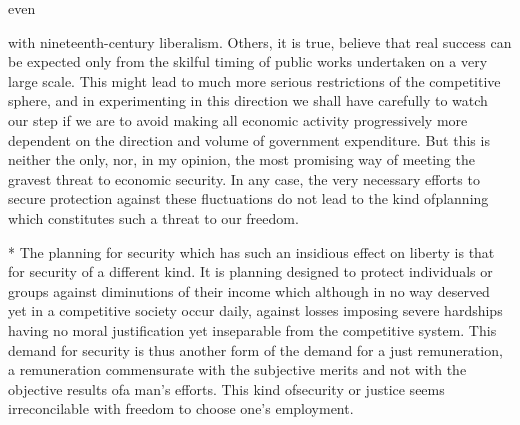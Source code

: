 \documentclass[11pt,openany]{book}
\begin{document}
even

with nineteenth-century liberalism. Others, it is true, believe that real success can be expected only from the skilful timing of public works undertaken on a very large scale. This might lead to much more serious restrictions of the competitive sphere, and in experimenting in this direction we shall have carefully to watch our step if we are to avoid making all economic activity progressively more dependent on the direction and volume of government expenditure. But this is neither the only, nor, in my opinion, the most promising way of meeting the gravest threat to economic security. In any case, the very necessary efforts to secure protection against these fluctuations do not lead to the kind ofplanning which constitutes such a threat to our freedom.

\begin{center}\textasteriskcentered\hspace{0.9em}\textasteriskcentered\hspace{0.9em}\textasteriskcentered\end{center}

\begin{center}\textasteriskcentered\hspace{0.9em}\textasteriskcentered\hspace{0.9em}\textasteriskcentered\end{center}

\begin{center}\textasteriskcentered\hspace{0.9em}\textasteriskcentered\hspace{0.9em}\textasteriskcentered\end{center}

\begin{center}\textasteriskcentered\hspace{0.9em}\textasteriskcentered\hspace{0.9em}\textasteriskcentered\end{center}

* The planning for security which has such an insidious effect on liberty is that for security of a different kind. It is planning designed to protect individuals or groups against diminutions of their income which although in no way deserved yet in a competitive society occur daily, against losses imposing severe hardships having no moral justification yet inseparable from the competitive system. This demand for security is thus another form of the demand for a just remuneration, a remuneration commensurate with the subjective merits and not with the objective results ofa man's efforts. This kind ofsecurity or justice seems irreconcilable with freedom to choose one's employment.
\end{document}
